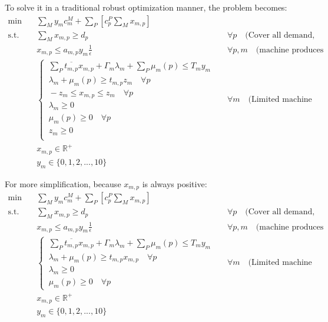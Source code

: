 \documentclass[fleqn,10pt]{wlscirep}
\begin{document}
To solve it in a traditional robust optimization manner, the problem becomes:
\begin{align}
    \min \quad & \sum_{M} y_{m} c^{M}_{m} + \sum_{P} \left[c^{P}_{p} \sum_{M} x_{m, p} \right] \\
    \text{s.t.} \quad & \sum_{M} x_{m, p} \geq d_{p} && \forall p \quad \text{(Cover all demand, \$)} \\
    & x_{m, p} \leq a_{m, p} y_{m} \frac{1}{\epsilon} && \forall p, m \quad \text{(machine produces some products)} \\
    & \begin{cases}
        \, \sum_{P} \overline{t_{m, p}} x_{m, p} + \Gamma_{m} \lambda_{m} + \sum_{P} \mu_{m}(p) \leq T_{m} y_{m} \\
        \, \lambda_{m} + \mu_{m}(p) \geq t_{m, p} z_{m} \quad \forall p \\
        \, - z_{m} \leq x_{m, p} \leq z_{m} \quad \forall p \\
        \, \lambda_{m} \geq 0 \\
        \, \mu_{m}(p) \geq 0 \quad \forall p \\
        \, z_{m} \geq 0  \\
    \end{cases} && \forall m \quad \text{(Limited machine production time, hour)} \\
    & x_{m, p} \in \mathbb{R}^+ \\
    & y_{m} \in \{0, 1, 2, ..., 10\}
\end{align}

For more simplification, because $x_{m, p}$ is always positive:
\begin{align}
    \min \quad & \sum_{M} y_{m} c^{M}_{m} + \sum_{P} \left[c^{P}_{p} \sum_{M} x_{m, p} \right] \\
    \text{s.t.} \quad & \sum_{M} x_{m, p} \geq d_{p} && \forall p \quad \text{(Cover all demand, \$)} \\
    & x_{m, p} \leq a_{m, p} y_{m} \frac{1}{\epsilon} && \forall p, m \quad \text{(machine produces some products)} \\
    & \begin{cases}
        \, \sum_{P} \overline{t_{m, p}} x_{m, p} + \Gamma_{m} \lambda_{m} + \sum_{P} \mu_{m}(p) \leq T_{m} y_{m} \\
        \, \lambda_{m} + \mu_{m}(p) \geq t_{m, p} x_{m, p} \quad \forall p \\
        \, \lambda_{m} \geq 0 \\
        \, \mu_{m}(p) \geq 0 \quad \forall p
    \end{cases} && \forall m \quad \text{(Limited machine production time, hour)} \\
    & x_{m, p} \in \mathbb{R}^+ \\
    & y_{m} \in \{0, 1, 2, ..., 10\}
\end{align}
\end{document}
